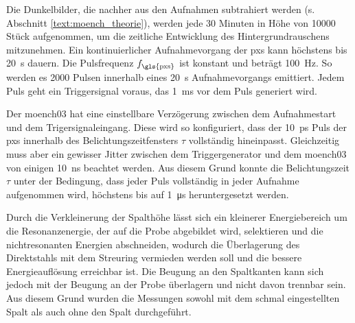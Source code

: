 \noindent
Die Dunkelbilder, die nachher aus den Aufnahmen subtrahiert werden (s. Abschnitt \ref{text:moench_theorie}), werden jede 30 Minuten in Höhe von \num{10000} Stück aufgenommen, um die zeitliche Entwicklung des Hintergrundrauschens mitzunehmen. Ein kontinuierlicher Aufnahmevorgang der \gls{pxs} kann höchstens bis \SI{20}{\second} dauern. Die Pulsfrequenz $f_\text{\gls{pxs}}$ ist konstant und beträgt \SI{100}{\hertz}. So werden es \num{2000} Pulsen innerhalb eines \SI{20}{\second} Aufnahmevorgangs emittiert. Jedem Puls geht ein Triggersignal voraus, das \SI{1}{\milli\second} vor dem Puls generiert wird.

\noindent
Der \gls{moench03} hat eine einstellbare Verzögerung zwischen dem Aufnahmestart und dem Trigersignaleingang. Diese wird so konfiguriert, dass der \SI{10}{\pico\second} Puls der \gls{pxs} innerhalb des Belichtungszeitfensters $\tau$ vollständig hineinpasst. Gleichzeitig muss aber ein gewisser Jitter zwischen dem Triggergenerator und dem \gls{moench03} von einigen \SI{10}{\nano\second} beachtet werden. Aus diesem Grund konnte die Belichtungszeit $\tau$ unter der Bedingung, dass jeder Puls vollständig in jeder Aufnahme aufgenommen wird, höchstens bis auf \SI{1}{\micro\second} heruntergesetzt werden.

\noindent
Durch die Verkleinerung der Spalthöhe lässt sich ein kleinerer Energiebereich um die Resonanzenergie, der auf die Probe abgebildet wird, selektieren und die nichtresonanten Energien abschneiden, wodurch die Überlagerung des Direktstahls mit dem Streuring vermieden werden soll und die bessere Energieauflösung erreichbar ist. Die Beugung an den Spaltkanten kann sich jedoch mit der Beugung an der Probe überlagern und nicht davon trennbar sein. Aus diesem Grund wurden die Messungen sowohl mit dem schmal eingestellten Spalt als auch ohne den Spalt durchgeführt.

